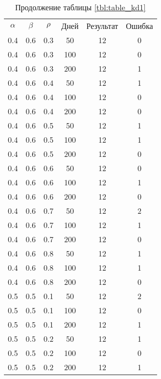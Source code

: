 \begin{table}[h]
	\begin{center}
        \begin{threeparttable}
        \captionsetup{justification=raggedright,singlelinecheck=off}
		\caption*{Продолжение таблицы \ref{tbl:table_kd1}}
		\begin{tabular}{|c|c|c|c|c|c|}
  	\hline
	$\alpha$ & $\beta$ & $\rho$ & Дней & Результат & Ошибка \\
	0.4 &  0.6 &  0.3 &   50 &    12 &     0 \\
	0.4 &  0.6 &  0.3 &  100 &    12 &     0 \\
	0.4 &  0.6 &  0.3 &  200 &    12 &     1 \\
   \hline
	0.4 &  0.6 &  0.4 &   50 &    12 &     1 \\
	0.4 &  0.6 &  0.4 &  100 &    12 &     0 \\
	0.4 &  0.6 &  0.4 &  200 &    12 &     0 \\
   \hline
	0.4 &  0.6 &  0.5 &   50 &    12 &     1 \\
	0.4 &  0.6 &  0.5 &  100 &    12 &     1 \\
	0.4 &  0.6 &  0.5 &  200 &    12 &     0 \\
   \hline
	0.4 &  0.6 &  0.6 &   50 &    12 &     0 \\
	0.4 &  0.6 &  0.6 &  100 &    12 &     1 \\
	0.4 &  0.6 &  0.6 &  200 &    12 &     0 \\
   \hline
	0.4 &  0.6 &  0.7 &   50 &    12 &     2 \\
	0.4 &  0.6 &  0.7 &  100 &    12 &     1 \\
	0.4 &  0.6 &  0.7 &  200 &    12 &     0 \\
   \hline
	0.4 &  0.6 &  0.8 &   50 &    12 &     1 \\
	0.4 &  0.6 &  0.8 &  100 &    12 &     1 \\
	0.4 &  0.6 &  0.8 &  200 &    12 &     0 \\
   \hline
	0.5 &  0.5 &  0.1 &   50 &    12 &     2 \\
	0.5 &  0.5 &  0.1 &  100 &    12 &     0 \\
	0.5 &  0.5 &  0.1 &  200 &    12 &     1 \\
   \hline
	0.5 &  0.5 &  0.2 &   50 &    12 &     1 \\
	0.5 &  0.5 &  0.2 &  100 &    12 &     0 \\
	0.5 &  0.5 &  0.2 &  200 &    12 &     1 \\
   \hline

\end{tabular}
\end{threeparttable}
\end{center}
\end{table}
